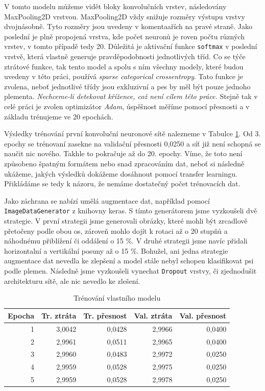 \documentclass[a4paper,12pt]{article}
\begin{document}
V tomto modelu můžeme vidět bloky konvolučních vrstev, následovány MaxPooling2D vrstvou. MaxPooling2D vždy snižuje rozměry výstupu vrstvy dvojnásobně. 
Tyto rozměry jsou uvedeny v komentaařích na pravé straně. Jako poslední je plně propojená vrstva, kde počet neuronů je roven počtu různých vrstev, v tomto případě tedy 20. Důležitá je aktivační funkce \texttt{softmax} v poslední vrstvě, která vlastně generuje pravděpodobnosti jednotlivých tříd.
Co se týče ztrátové funkce, tak tento model a spolu s ním všechny modely, které budou uvedeny v této práci, používá \emph{sparse categorical crossentropy}.
Tato funkce je zvolena, neboť jednotlivé třídy jsou exkluzivní a pes by měl být pouze jednoho plementa. \emph{Nechceme-li detekovat křížence, což není cílem této práce.} Stejně tak v celé práci je zvolen optimizátor \emph{Adam}, úspěšnost měříme pomocí přesnosti a v základu trénujeme ve 20 epochách.

Výsledky trénování první konvoluční neuronové sítě nalezneme v Tabulce \ref{tab:first_cnn_train_res}. Od 3. epochy se trénovaní zasekne na validační přesnosti
0,0250 a síť již není schopná se naučit nic nového. Takhle to pokračuje až do 20. epochy. Víme, že toto není způsobeno špatným formátem nebo snad zpracováním dat,
neboť si následně ukážeme, jakých výsledků dokážeme dosáhnout pomocí transfer learningu. Přikládáme se tedy k názoru, že nemáme dostatečný počet trénovacích dat.

Jako záchrana se nabízí umělá augmentace dat, například pomocí \texttt{ImageDataGenerator} z knihovny keras. S tímto generátorem jsme vyzkoušeli dvě strategie.
V první strategii jsme generovali obrázky, které mohli být zrcadlově přetočeny podle obou os, zároveň mohlo dojít k rotaci až o 20 stupňů a náhodnému přiblížení či oddálení o 15 \%. V druhé strategii jsme navíc přidali horizontalní a vertikální posuny až o 15 \%. Bohužel, ani jedna strategie augmentace dat nevedla ke zlepšení a model stále nebyl schopen klasifikovat psi podle plemen. Následně jsme vyzkoušeli vynechat \texttt{Dropout} vrstvy, či zjednodušit architekturu sítě, ale nic nevedlo ke zlešení.

\begin{table}[h!]
    \centering
    \begin{tabular}{r | r | r | r | r}
    \toprule
    Epocha & Tr. ztráta & Tr. přesnost & Val. ztráta & Val. přesnost \\\midrule
    1       & 3,0042 & 0,0428 & 2,9966 & 0,0400 \\
    2       & 2,9961 & 0,0511 & 2,9965 & 0,0400 \\
    3       & 2,9960 & 0,0483 & 2,9972 & 0,0250 \\
    4       & 2,9959 & 0,0528 & 2,9975 & 0,0250 \\
    5       & 2,9959 & 0,0528 & 2,9978 & 0,0250 \\
    \bottomrule
    \end{tabular}
    \caption{Trénování vlastního modelu}
    \label{tab:first_cnn_train_res}
\end{table}
\end{document}
